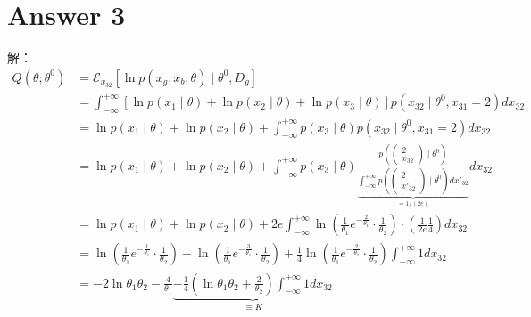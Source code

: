 \documentclass[a4paper,11pt,onecolumn,oneside,UTF8]{article}
\begin{document}
\section*{Answer 3}
解：
$$
    \begin{aligned}
        Q\left(\theta;\theta^0\right)
         & = \mathcal{E}_{x_{32}}\left[\ln p\left(x_g,x_b;\theta\right)\mid\theta^0,D_g\right]               \\
         & = \int_{-\infty}^{+\infty}\left[\ln p\left(x_1\mid\theta\right)+\ln p\left(x_2\mid
        \theta\right)+\ln p\left(x_3\mid\theta\right)\right]p\left(x_{32}\mid\theta^0,x_{31}=2\right)dx_{32} \\
         & = \ln p\left(x_1\mid\theta\right)+\ln p\left(x_2\mid\theta\right)+\int_{-\infty}^{+\infty}
        p\left(x_3\mid\theta\right)p\left(x_{32}\mid\theta^0,x_{31}=2\right)dx_{32}                          \\
         & = \ln p\left(x_1\mid\theta\right)+\ln p\left(x_2\mid\theta\right)+\int_{-\infty}^{+\infty}
        p\left(x_3\mid\theta\right)\frac{p\left(\begin{pmatrix} 2\\x_{32} \end{pmatrix}\mid\theta^0\right)}
        {\underbrace{\int_{-\infty}^{+\infty}p\left(\begin{pmatrix} 2\\x'_{32} \end{pmatrix}
        \mid\theta^0\right)dx'_{32}}_{=1/\left(2e\right)}}dx_{32}                                            \\
         & = \ln p\left(x_1\mid\theta\right)+\ln p\left(x_2\mid\theta\right)+2e\int_{-\infty}^{+\infty}
        \ln\left(\frac{1}{\theta_1}e^{-\frac{2}{\theta_1}}\cdot\frac{1}{\theta_2}\right)\cdot
        \left(\frac{1}{2e}\frac{1}{4}\right)dx_{32}                                                          \\
         & = \ln\left(\frac{1}{\theta_1}e^{-\frac{1}{\theta_1}}\cdot\frac{1}{\theta_2}\right)+
        \ln\left(\frac{1}{\theta_1}e^{-\frac{3}{\theta_1}}\cdot\frac{1}{\theta_2}\right)+
        \frac{1}{4}\ln\left(\frac{1}{\theta_1}e^{-\frac{2}{\theta_1}}\cdot\frac{1}{\theta_2}\right)
        \int_{-\infty}^{+\infty}1dx_{32}                                                                     \\
         & = -2\ln\theta_1\theta_2-\frac{4}{\theta_1}\underbrace{-\frac{1}{4}\left(\ln\theta_1
        \theta_2+\frac{2}{\theta_2}\right)\int_{-\infty}^{+\infty}1dx_{32}}_{\equiv K}
    \end{aligned}
$$
\end{document}
